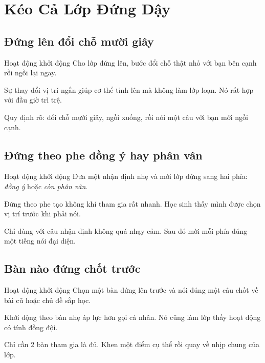 \chapter{Kéo Cả Lớp Đứng Dậy}

\section{Đứng lên đổi chỗ mười giây}
\begin{khoidongbox}{Hoạt động khởi động}
Cho lớp đứng lên, bước đổi chỗ thật nhỏ với bạn bên cạnh rồi ngồi lại ngay.
\end{khoidongbox}
\begin{visaohieuqua}
Sự thay đổi vị trí ngắn giúp cơ thể tỉnh lên mà không làm lớp loạn. Nó rất hợp với đầu giờ trì trệ.
\end{visaohieuqua}
\begin{cachlam5phut}
Quy định rõ: đổi chỗ mười giây, ngồi xuống, rồi nói một câu với bạn mới ngồi cạnh.
\end{cachlam5phut}
\ngancach

\section{Đứng theo phe đồng ý hay phân vân}
\begin{khoidongbox}{Hoạt động khởi động}
Đưa một nhận định nhẹ và mời lớp đứng sang hai phía: \textit{đồng ý} hoặc \textit{còn phân vân}.
\end{khoidongbox}
\begin{visaohieuqua}
Đứng theo phe tạo không khí tham gia rất nhanh. Học sinh thấy mình được chọn vị trí trước khi phải nói.
\end{visaohieuqua}
\begin{cachlam5phut}
Chỉ dùng với câu nhận định không quá nhạy cảm. Sau đó mời mỗi phía đúng một tiếng nói đại diện.
\end{cachlam5phut}
\ngancach

\section{Bàn nào đứng chốt trước}
\begin{khoidongbox}{Hoạt động khởi động}
Chọn một bàn đứng lên trước và nói đúng một câu chốt về bài cũ hoặc chủ đề sắp học.
\end{khoidongbox}
\begin{visaohieuqua}
Khởi động theo bàn nhẹ áp lực hơn gọi cá nhân. Nó cũng làm lớp thấy hoạt động có tính đồng đội.
\end{visaohieuqua}
\begin{cachlam5phut}
Chỉ cần 2 bàn tham gia là đủ. Khen một điểm cụ thể rồi quay về nhịp chung của lớp.
\end{cachlam5phut}
\ngancach

